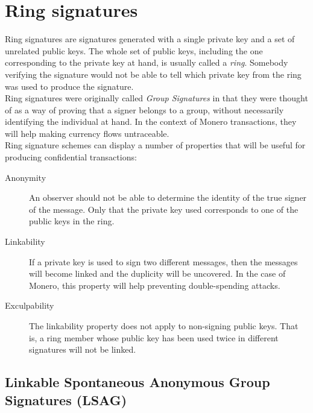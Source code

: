 
\chapter{Ring signatures}
\label{chapter:ring-signatures}


Ring signatures are signatures generated with a single private key and a set of unrelated public keys.
The whole set of public keys, including the one corresponding to the private key at hand, is usually called a {\em ring}.
Somebody verifying the signature would not be able to tell which private key from the ring was used to produce the
signature.
\\

Ring signatures were originally called {\em Group Signatures} in that they were thought of as a way of proving that a signer belongs to a group, without necessarily identifying the individual at hand.
In the context of Monero transactions, they will help making currency flows untraceable.
\\

Ring signature schemes can display a number of properties that will be useful for producing confidential transactions:

\begin{description}
	
	\item[Anonymity] 
	An observer should not be able to determine the identity of the true signer of the message. Only that the private key used corresponds to one of the public keys in the ring.
	
		
	\item[Linkability] 
	If a private key is used to sign two different messages, then the messages will become linked and the duplicity will be  uncovered. In the case of Monero, this property will help preventing double-spending attacks.
	 
	 
	\item[Exculpability]
	The linkability property does not apply to non-signing public keys. That is, a ring member whose
	public key has been used twice in different signatures will not be linked.
	
\end{description}




\section{Linkable Spontaneous Anonymous Group Signatures (LSAG)}

